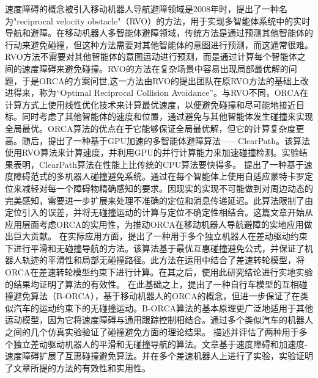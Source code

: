速度障碍的概念被引入移动机器人导航避障领域是2008年时，\citet{van2008reciprocal}提出了一种名为"reciprocal velocity obstacle"（RVO）的方法，用于实现多智能体系统中的实时导航和避障。在移动机器人多智能体避障领域，传统方法是通过预测其他智能体的行动来避免碰撞，但这种方法需要对其他智能体的意图进行预测，而这通常很难。RVO方法不需要对其他智能体的意图运动进行预测，而是通过计算每个智能体之间的速度障碍来避免碰撞。RVO的方法在复杂场景中容易出现局部最优解的问题，于是ORCA\cite{van2011reciprocal}的方案问世,这一方法由RVO的提出团队在原RVO方法的基础上改进得来，称为“Optimal Reciprocal Collision Avoidance”。与RVO不同，ORCA在计算方式上使用线性优化技术来计算最优速度，以便避免碰撞和尽可能地接近目标。同时考虑了其他智能体的速度和位置，通过避免与其他智能体发生碰撞来实现全局最优。ORCA算法的优点在于它能够保证全局最优解，但它的计算复杂度更高。随后，\citet{guy2009clearpath}提出了一种基于GPU加速的多智能体避障算法——ClearPath。该算法使用RVO算法来计算速度，并利用GPU的并行计算能力来加速碰撞检测。实验结果表明，ClearPath算法在性能上比传统的CPU算法要快得多。
\citet{hennes2012multi}提出了一种基于速度障碍范式的多机器人碰撞避免系统。通过在每个智能体上使用自适应蒙特卡罗定位来减轻对每一个障碍物精确感知的要求。因现实的实现不可能做到对周边动态的完美感知，需要进一步扩展来处理不准确的定位和消息传递延迟。此算法限制了由定位引入的误差，并将无碰撞运动的计算与定位不确定性相结合。这篇文章开始从应用层面考虑ORCA的实用性，为推动ORCA在移动机器人导航避障的实地应用做出巨大贡献。
在实际应用方面，\citet{snape2010smooth}提出了一种用于多个独立机器人在差动驱动约束下进行平滑和无碰撞导航的方法。该算法基于最优互惠碰撞避免公式，并保证了机器人轨迹的平滑性和局部无碰撞路径。此方法在运用中结合了差速转轮模型，将ORCA在差速转轮模型约束下进行计算。在其之后，使用此研究结论进行实地实验的结果均证明了算法的有效性。
在此基础之上，\citet{alonso2012reciprocal}提出了一种自行车模型的互相碰撞避免算法（B-ORCA），基于移动机器人的ORCA的概念，但进一步保证了在类似汽车的运动约束下的无碰撞运动。B-ORCA算法的基本原理更广泛地适用于其他运动模型，因为它将速度障碍与通用跟踪控制相结合。通过多个类似汽车的机器人之间的几个仿真实验验证了碰撞避免方面的理论结果。
\citet{snape2014smooth}描述并评估了两种用于多个独立差动驱动机器人的平滑和无碰撞导航的算法。文章基于速度障碍和加速度-速度障碍扩展了互惠碰撞避免算法。并在多个差速机器人上进行了实验，实验证明了文章所提的方法的有效性和实用性。



